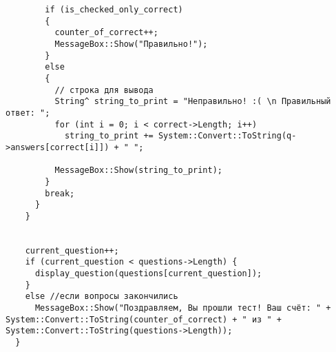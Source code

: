 \begin{verbatim}
        if (is_checked_only_correct)
        {
          counter_of_correct++;
          MessageBox::Show("Правильно!");
        }
        else
        {
          // строка для вывода 
          String^ string_to_print = "Неправильно! :( \n Правильный ответ: ";
          for (int i = 0; i < correct->Length; i++)
            string_to_print += System::Convert::ToString(q->answers[correct[i]]) + " ";

          MessageBox::Show(string_to_print);
        }
        break;
      }
    }

    
    current_question++;
    if (current_question < questions->Length) {
      display_question(questions[current_question]);
    }
    else //если вопросы закончились
      MessageBox::Show("Поздравляем, Вы прошли тест! Ваш счёт: " + System::Convert::ToString(counter_of_correct) + " из " + System::Convert::ToString(questions->Length));
  }
\end{verbatim}